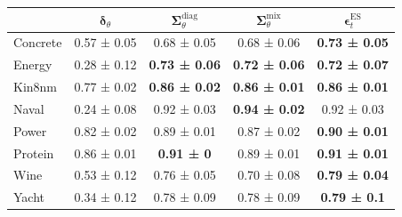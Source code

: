 \begin{tabular}{l|c|c|c|c}
\toprule
 & $\bm\delta_\theta$ & $\bm\Sigma_\theta^{\mathrm{diag}}$ & $\bm\Sigma_\theta^{\mathrm{mix}}$ & $\bm\epsilon_t^\mathrm{ES}$ \\
\midrule
Concrete & 0.57 ± 0.05 & 0.68 ± 0.05 & 0.68 ± 0.06 & \textbf{0.73 ± 0.05} \\
Energy & 0.28 ± 0.12 & \textbf{0.73 ± 0.06} & \textbf{0.72 ± 0.06} & \textbf{0.72 ± 0.07} \\
Kin8nm & 0.77 ± 0.02 & \textbf{0.86 ± 0.02} & \textbf{0.86 ± 0.01} & \textbf{0.86 ± 0.01} \\
Naval & 0.24 ± 0.08 & 0.92 ± 0.03 & \textbf{0.94 ± 0.02} & 0.92 ± 0.03 \\
Power & 0.82 ± 0.02 & 0.89 ± 0.01 & 0.87 ± 0.02 & \textbf{0.90 ± 0.01} \\
Protein & 0.86 ± 0.01 & \textbf{0.91 ± 0} & 0.89 ± 0.01 & \textbf{0.91 ± 0.01} \\
Wine & 0.53 ± 0.12 & 0.76 ± 0.05 & 0.70 ± 0.08 & \textbf{0.79 ± 0.04} \\
Yacht & 0.34 ± 0.12 & 0.78 ± 0.09 & 0.78 ± 0.09 & \textbf{0.79 ± 0.1} \\
\bottomrule
\end{tabular}
